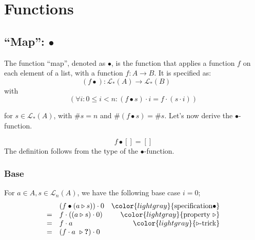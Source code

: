 \documentclass[onesided]{memoir}
\begin{document}
    
    \chapter{Functions} \newpage \pagecolor{white}
    
    \section{``Map'': $\bullet$}
    The function ``map'', denoted as $\bullet$, is the function that applies a function $f$ on each element of a list, with a function $f: A \rightarrow B$. It is specified as:
    \begin{displaymath}
        (f \bullet): \mathcal{L}_*(A) \rightarrow \mathcal{L}_*(B) \qquad 
    \end{displaymath}
        with
    \begin{displaymath}
        (\forall i: 0 \leq i < n: (f\bullet s)\cdot i = f \cdot (s \cdot i))
    \end{displaymath}
    
    for $s \in \mathcal{L}_*(A)$, with $\#s = n$ and $\#(f\bullet s) = \# s $.
    Let's now derive the $\bullet$-function.

        \begin{displaymath}
            f \bullet [] = []
        \end{displaymath}
        The definition follows from the type of the $\bullet$-function.
    

        \subsection{Base}
        For $a \in A, s\in \mathcal{L}_n(A)$, we have the following base case  $i = 0$;
        \begin{displaymath} \begin{array}{llr}
          &  (f\bullet(a\triangleright s)) \cdot 0  & \color{lightgray}{\textrm{specification} \bullet} \\
        = & f \cdot ( (a\triangleright s)\cdot 0)   & \color{lightgray}{\textrm{property~} \triangleright}\\
        = & f \cdot a                               & \color{lightgray}{\triangleright \textrm{-trick}} \\
        = & ( f\cdot a ~\triangleright \textbf{?})\cdot 0 & 
        \end{array} \end{displaymath}
\end{document}
